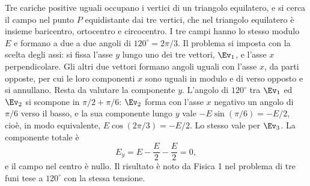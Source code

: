 \documentclass[main.tex]{subfiles}
\begin{document}
Tre cariche positive uguali occupano i vertici di un triangolo equilatero, e si cerca il campo nel punto $P$ equidistante dai tre vertici, che nel triangolo equilatero è insieme baricentro, ortocentro e circocentro. I tre campi hanno lo stesso modulo $E$ e formano a due a due angoli di $120^\circ=2\pi/3$. Il problema si imposta con la scelta degli assi: si fissa l'asse $y$ lungo uno dei tre vettori, $\Ev_1$, e l'asse $x$ perpendicolare. Gli altri due vettori formano angoli uguali con l'asse $x$, da parti opposte, per cui le loro componenti $x$ sono uguali in modulo e di verso opposto e si annullano. Resta da valutare la componente $y$. L'angolo di $120^\circ$ tra $\Ev_1$ ed $\Ev_2$ si scompone in $\pi/2+\pi/6$: $\Ev_2$ forma con l'asse $x$ negativo un angolo di $\pi/6$ verso il basso, e la sua componente lungo $y$ vale $-E\sin(\pi/6)=-E/2$, cioè, in modo equivalente, $E\cos(2\pi/3)=-E/2$. Lo stesso vale per $\Ev_3$. La componente totale è
\[
E_y=E-\frac{E}{2}-\frac{E}{2}=0 ,
\]
e il campo nel centro è nullo. Il risultato è noto da Fisica 1 nel problema di tre funi tese a $120^\circ$ con la stessa tensione.
\end{document}
